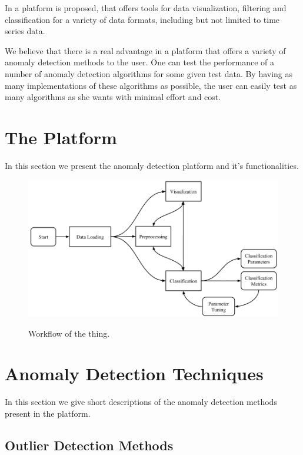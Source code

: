 \documentclass[a4paper, 10pt]{article}
\begin{document}
In \cite{tpad2018} a platform is proposed, that offers tools for data visualization, filtering and classification for a variety of data formats, including but not limited to time series data.

We believe that there is a real advantage in a platform that offers a variety of anomaly detection methods to the user. One can test the performance of a number of anomaly detection algorithms for some given test data. By having as many implementations of these algorithms as possible, the user can easily test as many algorithms as she wants with minimal effort and cost.

\section{The Platform \label{platform}}
 
In this section we present the anomaly detection platform and it's functionalities.

\begin{figure}
\centering
\includegraphics[width=\textwidth]{Workflow}
\label{fig:workflow}
\caption{Workflow of the thing.}
\end{figure}

\section{Anomaly Detection Techniques \label{methods}}

In this section we give short descriptions of the anomaly detection methods present in the platform.

\subsection{Outlier Detection Methods}
\end{document}
